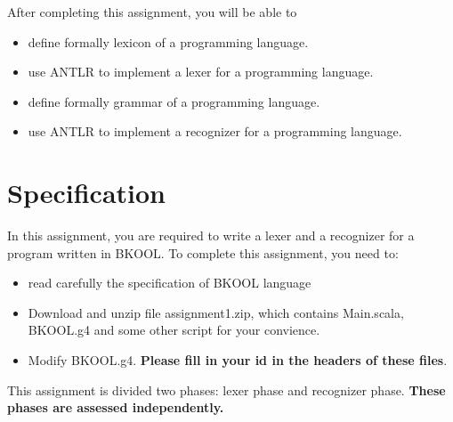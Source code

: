 \documentclass[11pt]{article}
\newcounter{numproblem}
\begin{document}
\vspace*{1cm}
\setcounter{numproblem}{0}

After completing this assignment, you will be able to 

\begin{itemize}
\item define formally lexicon of a programming language.
\item use ANTLR to implement a lexer for a programming language.
\item define formally grammar of a programming language.
\item use ANTLR to implement a recognizer for a programming language.
\end{itemize}

\section{Specification}
In this assignment, you are required to write a lexer and a recognizer for a program written in BKOOL. To complete this assignment, you need to:
\begin{itemize}
\item read carefully the specification of BKOOL language
\item Download and unzip file assignment1.zip, which contains Main.scala, BKOOL.g4 and some other script for your convience.
\item Modify BKOOL.g4. \textbf{Please fill in your id in the headers of these files}.
\end{itemize}
This assignment is divided two phases: lexer phase and recognizer phase. \textbf{These phases are assessed independently.}
\end{document}
